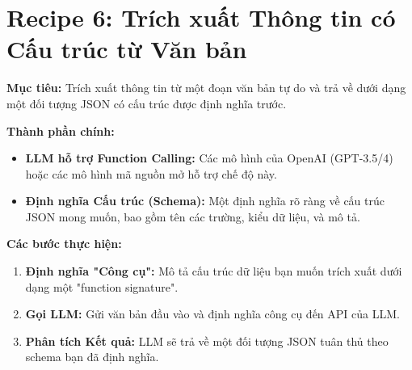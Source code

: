 
\section{Recipe 6: Trích xuất Thông tin có Cấu trúc từ Văn bản}
\label{sec:recipe_structured_extraction}

\textbf{Mục tiêu:} Trích xuất thông tin từ một đoạn văn bản tự do và trả về dưới dạng một đối tượng JSON có cấu trúc được định nghĩa trước.

\textbf{Thành phần chính:}
\begin{itemize}
    \item \textbf{LLM hỗ trợ Function Calling:} Các mô hình của OpenAI (GPT-3.5/4) hoặc các mô hình mã nguồn mở hỗ trợ chế độ này.
    \item \textbf{Định nghĩa Cấu trúc (Schema):} Một định nghĩa rõ ràng về cấu trúc JSON mong muốn, bao gồm tên các trường, kiểu dữ liệu, và mô tả.
\end{itemize}

\textbf{Các bước thực hiện:}
\begin{enumerate}
    \item \textbf{Định nghĩa "Công cụ":} Mô tả cấu trúc dữ liệu bạn muốn trích xuất dưới dạng một "function signature".
    \item \textbf{Gọi LLM:} Gửi văn bản đầu vào và định nghĩa công cụ đến API của LLM.
    \item \textbf{Phân tích Kết quả:} LLM sẽ trả về một đối tượng JSON tuân thủ theo schema bạn đã định nghĩa.
\end{enumerate}

